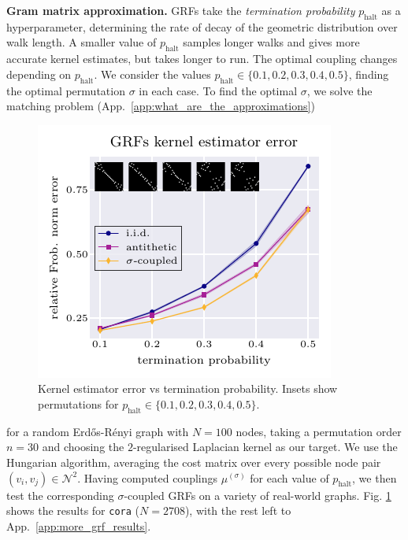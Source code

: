  \textbf{Gram matrix approximation.} GRFs take the \emph{termination probability} $p_\textrm{halt}$ as a hyperparameter, determining the rate of decay of the geometric distribution over walk length.
A smaller value of $p_\textrm{halt}$ samples longer walks and gives more accurate kernel estimates, but takes longer to run.
The optimal coupling changes depending on $p_\textrm{halt}$.
We consider the values $p_\textrm{halt} \in \{0.1,0.2,0.3,0.4,0.5\}$, finding the optimal permutation $\sigma$ in each case.
To find the optimal $\sigma$, we solve the matching problem (App.~\ref{app:what_are_the_approximations}) \begin{figure}
\vspace{-2mm} \hspace{-4mm} \centering
    \includegraphics{images/cora_grfs.pdf} 
     \vspace{-4mm}
\caption{Kernel estimator error vs termination probability. Insets show permutations for $p_\textrm{halt}\in\{0.1,0.2,0.3,0.4,0.5\}$.}\label{fig:permuton_grf} \vspace{-4mm}
\end{figure}for a random Erd\H os-R\'enyi graph with $N=100$ nodes, taking a permutation order $n=30$ and choosing the $2$-regularised Laplacian kernel as our target. 
We use the Hungarian algorithm, averaging the cost matrix over every possible node pair $(v_i,v_j)\in \mathcal{N}^2$. %
Having computed couplings $\mu^{(\sigma)}$ for each value of $p_\textrm{halt}$, we then test the corresponding $\sigma$-coupled GRFs on a variety of real-world graphs. 
Fig. \ref{fig:permuton_grf} shows the results for \lstinline{cora} ($N=2708$), with the rest left to App.~\ref{app:more_grf_results}.
